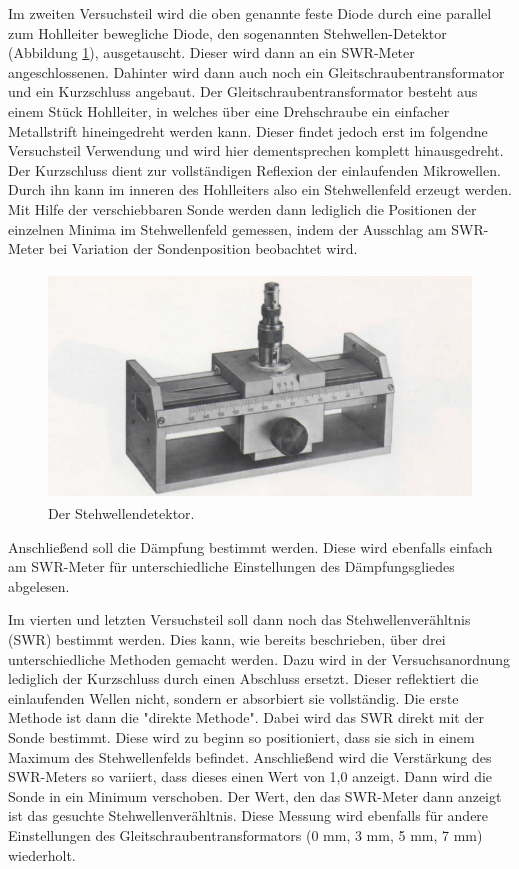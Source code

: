 Im zweiten Versuchsteil wird die oben genannte feste Diode durch eine parallel
zum Hohlleiter bewegliche Diode, den sogenannten Stehwellen-Detektor (Abbildung \ref{fig:stehwellendetektor}), ausgetauscht. Dieser wird dann an ein SWR-Meter angeschlossenen.
Dahinter wird dann auch noch ein Gleitschraubentransformator und ein Kurzschluss angebaut.
Der Gleitschraubentransformator besteht aus einem Stück Hohlleiter, in welches über eine Drehschraube ein einfacher
Metallstrift hineingedreht werden kann. Dieser findet jedoch erst im folgendne Versuchsteil
Verwendung und wird hier dementsprechen komplett hinausgedreht. Der Kurzschluss
dient zur vollständigen Reflexion der einlaufenden Mikrowellen. Durch ihn kann
im inneren des Hohlleiters also ein Stehwellenfeld erzeugt werden. Mit Hilfe der
verschiebbaren Sonde werden dann lediglich die Positionen der einzelnen Minima
im Stehwellenfeld gemessen, indem der Ausschlag am SWR-Meter bei Variation der
Sondenposition beobachtet wird.

\begin{figure}[H]
  \centering
  \includegraphics[height=6cm]{Stehwellendetektor.PNG}
  \caption{Der Stehwellendetektor. \cite{sample1}}
  \label{fig:stehwellendetektor}
\end{figure}

Anschließend soll die Dämpfung bestimmt werden. Diese wird ebenfalls einfach am
SWR-Meter für unterschiedliche Einstellungen des Dämpfungsgliedes abgelesen.

Im vierten und letzten Versuchsteil soll dann noch das Stehwellenverähltnis (SWR) bestimmt werden.
Dies kann, wie bereits beschrieben, über drei unterschiedliche Methoden gemacht werden.
Dazu wird in der Versuchsanordnung lediglich der Kurzschluss durch einen Abschluss ersetzt.
Dieser reflektiert die einlaufenden Wellen nicht, sondern er absorbiert sie vollständig.
Die erste Methode ist dann die "direkte Methode". Dabei wird das SWR direkt mit der
Sonde bestimmt. Diese wird zu beginn so positioniert, dass sie sich in einem
Maximum des Stehwellenfelds befindet. Anschließend wird die Verstärkung des SWR-Meters
so variiert, dass dieses einen Wert von 1,0 anzeigt. Dann wird die Sonde in ein Minimum
verschoben. Der Wert, den das SWR-Meter dann anzeigt ist das gesuchte Stehwellenverähltnis.
Diese Messung wird ebenfalls für andere Einstellungen des Gleitschraubentransformators
(0 mm, 3 mm, 5 mm, 7 mm) wiederholt.

